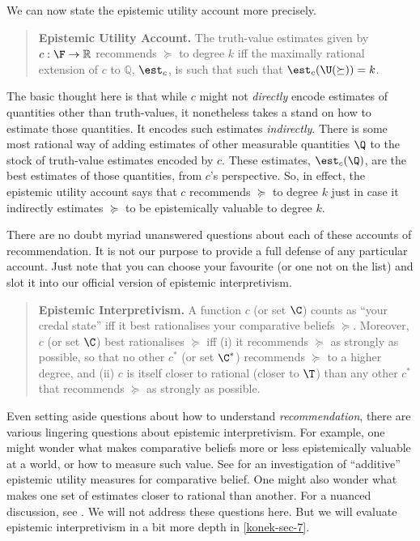 We can now state the epistemic utility account more precisely.
\begin{quote}
\textbf{Epistemic Utility Account.} The truth-value estimates given by $c:\F\rightarrow\mathbb{R}$ recommends $\succeq$ to degree $k$ iff the maximally rational extension of $c$ to $\mathbb{Q}$, $\est_c$, is such that such that $\est_c(\U(\succeq))=k$.
\end{quote}
The basic thought here is that while $c$ might not \textit{directly} encode estimates of quantities other than truth-values, it nonetheless takes a stand on how to estimate those quantities. It encodes such estimates \textit{indirectly}. There is some most rational way of adding estimates of other measurable quantities $\Q$ to the stock of truth-value estimates encoded by $c$. These estimates, $\est_c(\Q)$, are the best estimates of those quantities, from $c$'s perspective. So, in effect, the epistemic utility account says that $c$ recommends $\succeq$ to degree $k$ just in case it indirectly estimates $\succeq$ to be epistemically valuable to degree $k$.

There are no doubt myriad unanswered questions about each of these accounts of recommendation. It is not our purpose to provide a full defense of any particular account. Just note that you can choose your favourite (or one not on the list) and slot it into our official version of epistemic interpretivism.
\begin{quote}
\textbf{Epistemic Interpretivism.} A function $c$ (or set $\C$) counts as ``your credal state'' iff it best rationalises your comparative beliefs $\succeq$. Moreover, $c$ (or set $\C$) best rationalises $\succeq$ iff (i) it recommends $\succeq$ as strongly as possible, so that no other $c^*$ (or set $\C^*$) recommends $\succeq$ to a higher degree, and (ii) $c$ is itself closer to rational (closer to $\T$) than any other $c^*$ that recommends $\succeq$ as strongly as possible. 
\end{quote}

Even setting aside questions about how to understand \textit{recommendation}, there are various lingering questions about epistemic interpretivism. For example, one might wonder what makes comparative beliefs more or less epistemically valuable at a world, or how to measure such value. See \citet{Fitelson2015} for an investigation of ``additive'' epistemic utility measures for comparative belief. One might also wonder what makes one set of estimates closer to rational than another. For a nuanced discussion, see \citet{Staffel2018}. We will not address these questions here. But we will evaluate epistemic interpretivism in a bit more depth in \autoref{konek-sec-7}.


